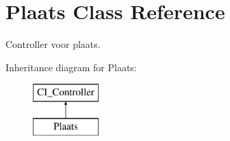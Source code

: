 \hypertarget{class_plaats}{}\section{Plaats Class Reference}
\label{class_plaats}


Controller voor plaats.  


Inheritance diagram for Plaats\+:\begin{figure}[H]
\begin{center}
\leavevmode
\includegraphics[height=2.000000cm]{class_plaats}
\end{center}
\end{figure}

